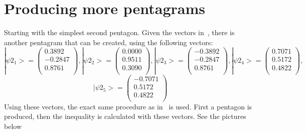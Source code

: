 \section{Producing more pentagrams}\label{sec:Producing more pentagrams}
Starting with the simplest second pentagon. Given the vectors in~, there is another pentagram that can be created, using the following vectors:
\begin{equation*}
|\psi2_1>=
\begin{pmatrix}
0.3892\\
-0.2847\\
0.8761\\
\end{pmatrix}
,
|\psi2_2>=
\begin{pmatrix}
0.0000\\
0.9511\\
0.3090\\
\end{pmatrix}
,
|\psi2_3>=
\begin{pmatrix}
-0.3892\\
-0.2847\\
0.8761\\
\end{pmatrix}
,
|\psi2_4>=
\begin{pmatrix}
0.7071\\
0.5172\\
0.4822\\
\end{pmatrix}
,
\end{equation*}
\begin{equation*}
|\psi2_5>=
\begin{pmatrix}
-0.7071\\
0.5172\\
0.4822\\
\end{pmatrix}
\end{equation*}
Using these vectors, the exact same procedure as in~ is used. First a pentagon is produced, then the inequality is calculated with these vectors. See the pictures below 
